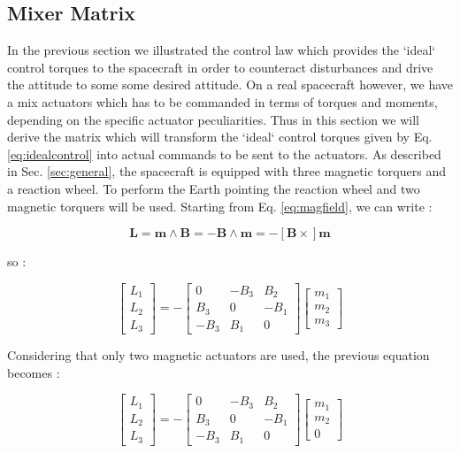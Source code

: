 \documentclass[11pt,a4paper]{report}
\begin{document}
\subsection{Mixer Matrix}
In the previous section we illustrated the control law which provides the `ideal` control torques to the spacecraft in order to counteract disturbances and drive the attitude to some some desired attitude.
On a real spacecraft however, we have a mix actuators which has to be commanded in terms of torques and moments, depending on the specific actuator peculiarities.
Thus in this section we will derive the matrix which will transform the `ideal` control torques given by Eq. \ref{eq:idealcontrol} into actual commands to be sent to the actuators. 
As described in Sec. \ref{sec:general}, the spacecraft is equipped with three magnetic torquers and a reaction wheel. 
To perform the Earth pointing the reaction wheel and two magnetic torquers will be used.
Starting from Eq. \ref{eq:magfield}, we can write :

\begin{equation}
 \mathbf{L} = \mathbf{m} \wedge \mathbf{B} = - \mathbf{B} \wedge \mathbf{m} = -[\mathbf{B} \times] \mathbf{m} 
\end{equation}

so : 


\begin{equation}
 \begin{bmatrix}
    L_1\\
    L_2\\
    L_3 
 \end{bmatrix}
= - 
 \begin{bmatrix}
    0 & -B_{3} & B_{2} \\
    B_{3} & 0 & -B_{1} \\
   -B_{3} & B_{1} & 0
 \end{bmatrix} 
 \begin{bmatrix}
    m_{1}\\
    m_{2}\\
    m_{3}
 \end{bmatrix}  
\end{equation}

Considering that only two magnetic actuators are used, the previous equation becomes : 

\begin{equation}
 \begin{bmatrix}
    L_1\\
    L_2\\
    L_3 
 \end{bmatrix}
= - 
 \begin{bmatrix}
    0 & -B_{3} & B_{2} \\
    B_{3} & 0 & -B_{1} \\
   -B_{3} & B_{1} & 0
 \end{bmatrix} 
 \begin{bmatrix}
    m_{1}\\
    m_{2}\\
    0
 \end{bmatrix}  
\end{equation}
\end{document}
